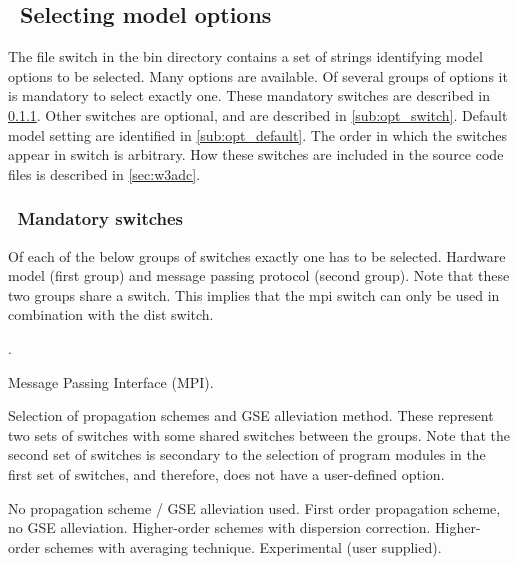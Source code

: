 \vssub
\subsection{~Selecting model options} \label{sec:switches}
\vssub

The file {\file switch} in the {\file bin} directory contains a set of strings
identifying model options to be selected. Many options are available. Of
several groups of options it is mandatory to select exactly one. These
mandatory switches are described in \para\ref{sub:man_switch}. Other switches
are optional, and are described in \para\ref{sub:opt_switch}. Default model
setting are identified in \para\ref{sub:opt_default}. The order in which the
switches appear in {\file switch} is arbitrary. How these switches are
included in the source code files is described in \para\ref{sec:w3adc}.

\vsssub
\subsubsection{~Mandatory switches} \label{sub:man_switch}
\vsssub

Of each of the below groups of switches exactly one has to be selected. 
Hardware model (first group) and message passing protocol (second group). Note
that these two groups share a switch. This implies that the {\sc mpi} switch
can only be used in combination with the {\sc dist} switch.
\begin{slist}
.
\end{slist}

\begin{slist}
 {Message Passing Interface (MPI).}
\end{slist}

\noindent
Selection of propagation schemes and GSE alleviation method. These represent
two sets of switches with some shared switches between the groups. Note that
the second set of switches is secondary to the selection of program modules
in the first set of switches, and therefore, does not have a user-defined
option.
\begin{slist}
 {No propagation scheme / GSE alleviation used.}
 {First order propagation scheme, no GSE alleviation.}
 {Higher-order schemes with \cite{art:BH87} dispersion correction.}
 {Higher-order schemes with \cite{tol:OMOD02b} averaging technique.}
 {Experimental (user supplied).}
\end{slist}

